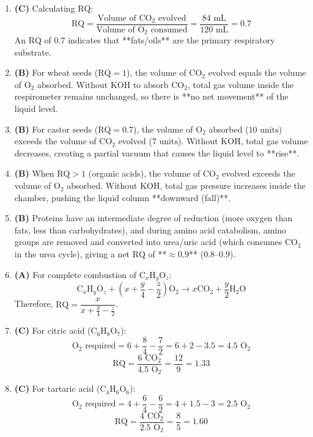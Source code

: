\documentclass[11pt, a4paper]{article}
\begin{document}
\begin{enumerate}[label=\textbf{\arabic*.}]
\item \textbf{(C)} Calculating $\text{RQ}$:
$$\text{RQ} = \frac{\text{Volume of } \text{CO}_2 \text{ evolved}}{\text{Volume of } \text{O}_2 \text{ consumed}} = \frac{84\text{ mL}}{120\text{ mL}} = \mathbf{0.7}$$
An $\text{RQ}$ of $0.7$ indicates that **fats/oils** are the primary respiratory substrate.

\item \textbf{(B)} For wheat seeds ($\text{RQ} = 1$), the volume of $\text{CO}_2$ evolved equals the volume of $\text{O}_2$ absorbed. Without $\text{KOH}$ to absorb $\text{CO}_2$, total gas volume inside the respirometer remains unchanged, so there is **no net movement** of the liquid level.

\item \textbf{(B)} For castor seeds ($\text{RQ} = 0.7$), the volume of $\text{O}_2$ absorbed ($10\text{ units}$) exceeds the volume of $\text{CO}_2$ evolved ($7\text{ units}$). Without $\text{KOH}$, total gas volume decreases, creating a partial vacuum that causes the liquid level to **rise**.

\item \textbf{(B)} When $\text{RQ} > 1$ (organic acids), the volume of $\text{CO}_2$ evolved exceeds the volume of $\text{O}_2$ absorbed. Without $\text{KOH}$, total gas pressure increases inside the chamber, pushing the liquid column **downward (fall)**.

\item \textbf{(B)} Proteins have an intermediate degree of reduction (more oxygen than fats, less than carbohydrates), and during amino acid catabolism, amino groups are removed and converted into urea/uric acid (which consumes $\text{CO}_2$ in the urea cycle), giving a net $\text{RQ}$ of **$\approx 0.9$** ($0.8\text{--}0.9$).

\item \textbf{(A)} For complete combustion of $\text{C}_x\text{H}_y\text{O}_z$:
$$\text{C}_x\text{H}_y\text{O}_z + \left(x + \frac{y}{4} - \frac{z}{2}\right)\text{O}_2 \longrightarrow x\text{CO}_2 + \frac{y}{2}\text{H}_2\text{O}$$
Therefore, $\text{RQ} = \dfrac{x}{x + \frac{y}{4} - \frac{z}{2}}$.

\item \textbf{(C)} For citric acid ($\text{C}_6\text{H}_8\text{O}_7$):
$$\text{O}_2 \text{ required} = 6 + \frac{8}{4} - \frac{7}{2} = 6 + 2 - 3.5 = 4.5\text{ O}_2$$
$$\text{RQ} = \frac{6\text{ CO}_2}{4.5\text{ O}_2} = \frac{12}{9} = \mathbf{1.33}$$

\item \textbf{(C)} For tartaric acid ($\text{C}_4\text{H}_6\text{O}_6$):
$$\text{O}_2 \text{ required} = 4 + \frac{6}{4} - \frac{6}{2} = 4 + 1.5 - 3 = 2.5\text{ O}_2$$
$$\text{RQ} = \frac{4\text{ CO}_2}{2.5\text{ O}_2} = \frac{8}{5} = \mathbf{1.60}$$


\end{enumerate}
\end{document}
